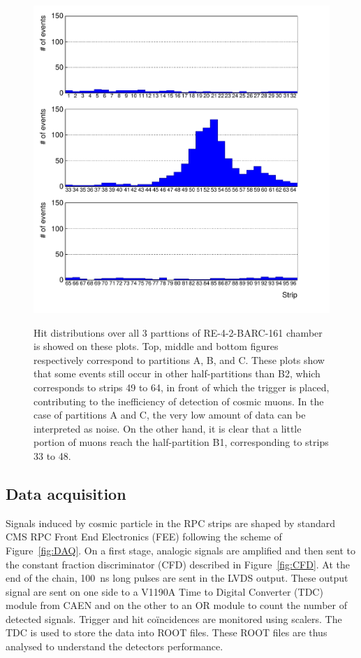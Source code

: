 		\begin{figure}[!h]
			\begin{center}
				\includegraphics[width = 1.2\plotwidth]{fig/Data-21-profile.pdf}\\
				\caption{\label{fig:HitProf} Hit distributions over all 3 parttions of RE-4-2-BARC-161 chamber is showed on these plots. Top, middle and bottom figures respectively correspond to partitions A, B, and C. These plots show that some events still occur in other half-partitions than B2, which corresponds to strips 49 to 64, in front of which the trigger is placed, contributing to the inefficiency of detection of cosmic muons. In the case of partitions A and C, the very low amount of data can be interpreted as noise. On the other hand, it is clear that a little portion of muons reach the half-partition B1, corresponding to strips 33 to 48.}
			\end{center}
		\end{figure}
		
	\subsection{Data acquisition}
	\label{ssec:GIFDAQ}
	
		Signals induced by cosmic particle in the RPC strips are shaped by standard CMS RPC Front End Electronics (FEE) following the scheme of Figure~\ref{fig:DAQ}. On a first stage, analogic signals are amplified and then sent to the constant fraction discriminator (CFD) described in Figure~\ref{fig:CFD}. At the end of the chain, \SI{100}{ns} long pulses are sent in the LVDS output. These output signal are sent on one side to a V1190A Time to Digital Converter (TDC) module from CAEN and on the other to an OR module to count the number of detected signals. Trigger and hit coïncidences are monitored using scalers. The TDC is used to store the data into ROOT files. These ROOT files are thus analysed to understand the detectors performance.

